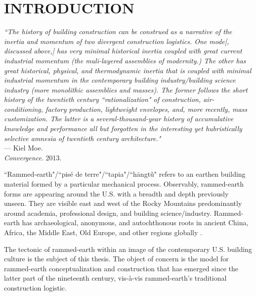 \section{INTRODUCTION}

\begin{flushright}
  \small{
  \textit{``The history of building construction can be construed as a narrative of the inertia and momentum of two divergent construction logistics. One mode[, discussed above,] has very minimal historical inertia coupled with great current industrial momentum (the muli-layered assemblies of modernity.) The other has great historical, physical, and thermodynamic inertia that is coupled with minimal industrial momentum in the contemporary building industry/building science industry (more monolithic assemblies and masses). The former follows the short history of the twentieth century ``rationalization" of construction, air-conditioning, factory production, lightweight envelopes, and, more recently, mass customization. The latter is a several-thousand-year history of accumulative knowledge and performance all but forgotten in the interesting yet hubristically selective amnesia of twentieth century architecture."}}\\ --- Kiel Moe. \\ \textit{Convergence}. 2013.
\end{flushright}

``Rammed-earth"/``pis\'e de terre"/``tapia"/``h\=angt\v u" refers to an earthen building material formed by a particular mechanical process. Observably, rammed-earth forms are appearing around the U.S. with a breadth and depth previously unseen. They are visible east and west of the Rocky Mountains predominantly around academia, professional design, and building science/industry. Rammed-earth has archaeological, anonymous, and autochthonous roots in ancient China, Africa, the Middle East, Old Europe, and other regions globally \cite{RAMMEDEARTHHOUSE}.

\vspace{5mm}

\noindent The tectonic of rammed-earth within an image of the contemporary U.S. building culture is the subject of this thesis. The object of concern is the model for rammed-earth conceptualization and construction that has emerged since the latter part of the nineteenth century, vis-\`a-vis rammed-earth's traditional construction logistic.

